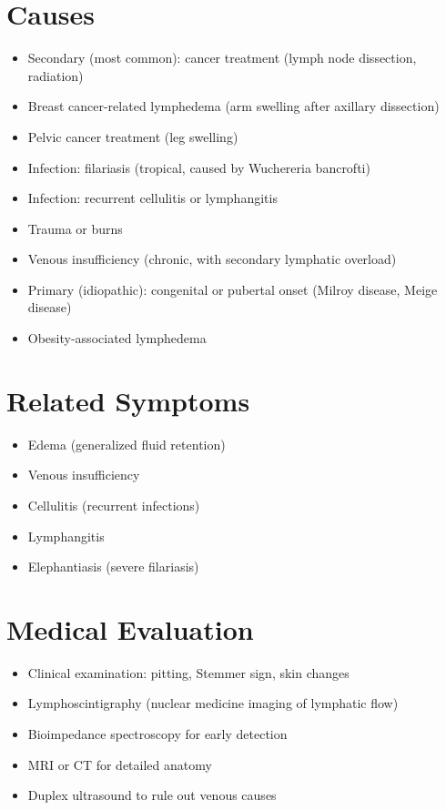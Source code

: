 \section*{Causes}
\begin{itemize}
\item Secondary (most common): cancer treatment (lymph node dissection, radiation)
\item Breast cancer-related lymphedema (arm swelling after axillary dissection)
\item Pelvic cancer treatment (leg swelling)
\item Infection: filariasis (tropical, caused by Wuchereria bancrofti)
\item Infection: recurrent cellulitis or lymphangitis
\item Trauma or burns
\item Venous insufficiency (chronic, with secondary lymphatic overload)
\item Primary (idiopathic): congenital or pubertal onset (Milroy disease, Meige disease)
\item Obesity-associated lymphedema
\end{itemize}

\section*{Related Symptoms}
\begin{itemize}
\item Edema (generalized fluid retention)
\item Venous insufficiency
\item Cellulitis (recurrent infections)
\item Lymphangitis
\item Elephantiasis (severe filariasis)
\end{itemize}

\section*{Medical Evaluation}
\begin{itemize}
\item Clinical examination: pitting, Stemmer sign, skin changes
\item Lymphoscintigraphy (nuclear medicine imaging of lymphatic flow)
\item Bioimpedance spectroscopy for early detection
\item MRI or CT for detailed anatomy
\item Duplex ultrasound to rule out venous causes
\end{itemize}

